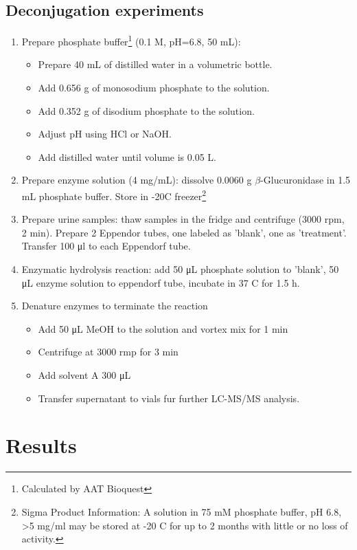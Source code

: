 \subsection{Deconjugation experiments}
\begin{enumerate}
\item Prepare phosphate buffer\footnote{Calculated by AAT Bioquest} (0.1 M, pH=6.8, 50 mL): 
	\begin{itemize}
		\item Prepare 40 mL of distilled water in a volumetric bottle.
		\item Add 0.656 g of monosodium phosphate to the solution.
		\item Add 0.352 g of disodium phosphate to the solution.
		\item Adjust pH using HCl or NaOH.
		\item Add distilled water until volume is 0.05 L.
	\end{itemize}

\item Prepare enzyme solution (4 mg/mL): dissolve 0.0060 g $\beta$-Glucuronidase in 1.5 mL phosphate buffer. Store in -20\degree C freezer\footnote{Sigma Product Information: A solution in 75 mM phosphate buffer, pH 6.8, \textgreater 5 mg/ml may be stored at -20 \degree C for up to 2 months with little or no loss of activity.}
\item Prepare urine samples: thaw samples in the fridge and centrifuge (3000 rpm, 2 min). Prepare 2 Eppendor tubes, one labeled as 'blank', one as 'treatment'. Transfer 100 \si{\micro\litre} to each Eppendorf tube.
\item Enzymatic hydrolysis reaction: add 50 \si{\micro\liter} phosphate solution to 'blank', 50 \si{\micro\liter} enzyme solution to eppendorf tube, incubate in 37 \degree C for 1.5 h.
\item Denature enzymes to terminate the reaction
	\begin{itemize}
	\item Add 50 \si{\micro\liter} MeOH to the solution and vortex mix for 1 min
	\item Centrifuge at 3000 rmp for 3 min
	\item Add solvent A 300 \si{\micro\liter}
	\item Transfer supernatant to vials fur further LC-MS/MS analysis.
\end{itemize}


\end{enumerate}

\section{Results}
